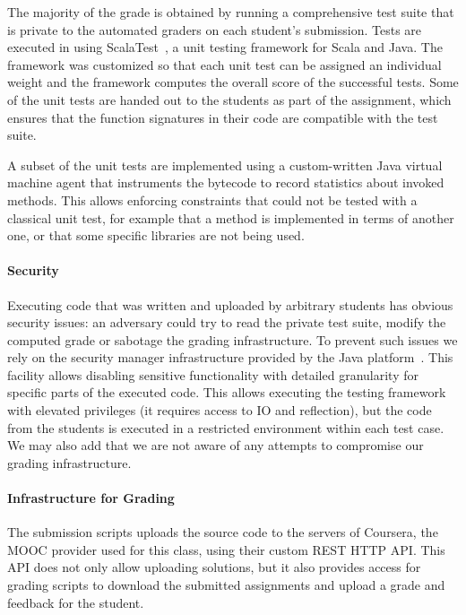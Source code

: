 \documentclass{sig-alternate}
\begin{document}
The majority of the grade is obtained by running a comprehensive test suite
that is private to the automated graders on each student's submission.
Tests are executed in using ScalaTest~\cite{scalatest}, a unit testing framework
for Scala and Java. The framework was customized so that each unit test can be
assigned an individual weight and the framework computes the overall score of
the successful tests. Some of the unit tests are handed out to the students as
part of the assignment, which ensures that the function signatures in their code
are compatible with the test suite.

A subset of the unit tests are implemented using a custom-written Java virtual
machine agent \cite{vmagents} that instruments the bytecode to record statistics about
invoked methods. This allows enforcing constraints that could not be tested with a
classical unit test, for example that a method is implemented in terms of another
one, or that some specific libraries are not being used.

\paragraph{Security}

Executing code that was written and uploaded by arbitrary students has obvious
security issues: an adversary could try to read the private test suite, modify
the computed grade or sabotage the grading infrastructure. To prevent such issues
we rely on the security manager infrastructure provided by the Java platform~\cite{securityManager}.
This facility allows disabling sensitive functionality with detailed granularity
for specific parts of the executed code. This allows executing the testing framework
with elevated privileges (it requires access to IO and reflection), but the code
from the students is executed in a restricted environment within each test case.
We may also add that we are not aware of any attempts to compromise our grading
infrastructure.

\paragraph{Infrastructure for Grading}

The submission scripts uploads the source code to the servers of Coursera, the
MOOC provider used for this class, using their custom REST HTTP API. This API
does not only allow uploading solutions, but it also provides access for grading
scripts to download the submitted assignments and upload a grade and feedback
for the student.
\end{document}

